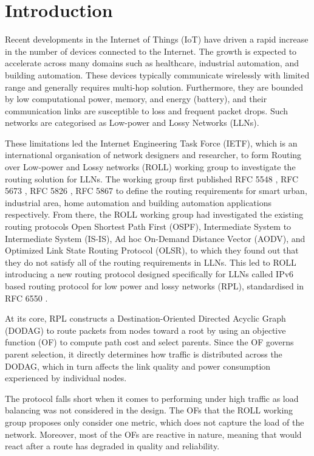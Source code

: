 \chapter{Introduction}\label{C:intro}
Recent developments in the Internet of Things (IoT) have driven a
rapid increase in the number of devices connected to the Internet.
The growth is expected to accelerate across many domains such as
healthcare, industrial automation, and building automation.
These devices typically communicate wirelessly with limited range and
generally requires multi-hop solution. Furthermore, they are bounded
by low computational power, memory, and energy (battery), and their
communication links are susceptible to loss and frequent packet
drops. Such networks are categorised as Low-power and
Lossy Networks (LLNs).

These limitations led the Internet Engineering Task Force (IETF),
which is an international organisation of network designers and
researcher, to form Routing over Low-power and Lossy networks (ROLL)
working group to investigate the routing solution for LLNs.
The working group first published RFC 5548 \cite{rfc5548}, RFC 5673
\cite{rfc5673}, RFC 5826 \cite{rfc5826}, RFC 5867 \cite{rfc5867} to
define the routing requirements for smart urban, industrial area,
home automation and building automation applications respectively.
From there, the ROLL working group had investigated the existing routing
protocols Open Shortest Path First (OSPF), Intermediate System to
Intermediate System (IS-IS), Ad hoc On-Demand Distance Vector (AODV),
and Optimized Link State Routing Protocol (OLSR), to which they found out that
they do not satisfy all of the routing requirements in LLNs.
This led to ROLL introducing a new routing protocol
designed specifically for LLNs called IPv6 based routing protocol for
low power and lossy networks (RPL), standardised in RFC 6550
\cite{alexanderRPLIPv6Routing2012}.

At its core, RPL constructs a Destination-Oriented Directed Acyclic
Graph (DODAG) to route packets from nodes toward a root by using an
objective function (OF) to compute path cost and select parents.
Since the OF governs parent selection, it
directly determines how traffic is distributed across the DODAG,
which in turn affects the link quality and power consumption
experienced by individual nodes.

The protocol falls short when it comes to performing under high traffic as
load balancing was not considered in the design. The OFs
that the ROLL working group proposes only consider one metric, which does not
capture the load of the network.
Moreover, most of the OFs are reactive in nature, meaning that would
react after a route has degraded in quality and reliability.

